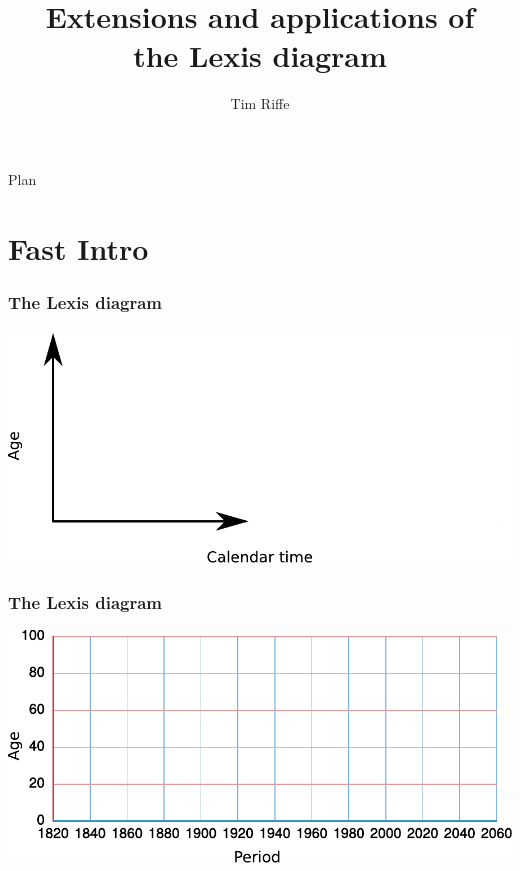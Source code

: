 \documentclass[20pt]{beamer}
\title{Extensions and applications of \\ the Lexis diagram}
\subtitle{Tim Riffe}		%
\begin{document}

\begin{frame}
	\titlepage
\end{frame}

\begin{frame}{Plan}
\tableofcontents
\end{frame}


%
\section{Fast Intro}

\begin{frame}
\frametitle{The Lexis diagram}
\includegraphics[scale=1.5]{Figures/APCrt0.pdf}\\
\end{frame}

\begin{frame}
\frametitle{The Lexis diagram}
\includegraphics[scale=1.5]{Figures/APCrt1.pdf}\\
\end{frame}
\end{document}
